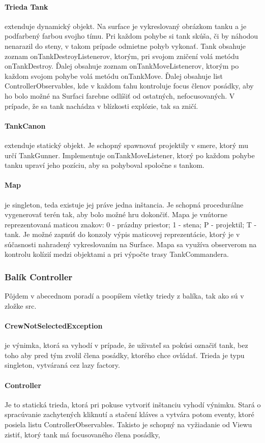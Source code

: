 \documentclass[12pt,oneside,slovak,a4paper]{article}
\begin{document}
\paragraph{Trieda Tank} extenduje dynamický objekt. Na surface je vykreslovaný obrázkom tanku a je podfarbený farbou svojho tímu. Pri každom pohybe si tank skúša, či by náhodou nenarazil do steny, v takom prípade odmietne pohyb vykonať. Tank obsahuje zoznam onTankDestroyListenerov, ktorým, pri svojom zničení volá metódu onTankDestroy. Ďalej obsahuje zoznam onTankMoveListenerov, ktorým po každom svojom pohybe volá metódu onTankMove. Ďalej obsahuje list ControllerObservables, kde v každom ťahu kontroluje focus členov posádky, aby ho bolo možné na Surfaci farebne odlíšiť od ostatných, nefocusovaných. V prípade, že sa tank nachádza v blízkosti explózie, tak sa zničí.
\paragraph{TankCanon} extenduje statický objekt. Je schopný spawnovať projektily v smere, ktorý mu určí TankGunner. Implementuje onTankMoveListener, ktorý po každom pohybe tanku upraví jeho pozíciu, aby sa pohyboval spoločne s tankom.
\paragraph{Map} je singleton, teda existuje jej práve jedna inštancia. Je schopná procedurálne vygenerovať terén tak, aby bolo možné hru dokončiť. Mapa je vnútorne reprezentovaná maticou znakov: 0 - prázdny priestor; 1 - stena; P - projektil; T - tank. Je možné zapnúť do konzoly výpis maticovej reprezentácie, ktorý je v súčasnosti nahradený vykreslovaním na Surface. Mapa sa využíva observerom na kontrolu kolízií medzi objektami a pri výpočte trasy TankCommandera.
\subsubsection{Balík Controller}
Pôjdem v abecednom poradí a poopíšem všetky triedy z balíka, tak ako sú v zložke src.
\paragraph{CrewNotSelectedException} je výnimka, ktorá sa vyhodí v prípade, že uživateľ sa pokúsi označiť tank, bez toho aby pred tým zvolil člena posádky, ktorého chce ovládať. Trieda je typu singleton, vytváraná cez lazy factory.
\paragraph{Controller} Je to statická trieda, ktorá pri pokuse vytvoriť inštanciu vyhodí výnimku. Stará o spracúvanie zachytených kliknutí a stačení kláves a vytvára potom eventy, ktoré posiela listu ControllerObservables. Takisto je schopný na vyžiadanie od Viewu zistiť, ktorý tank má focusovaného člena posádky,
\end{document}
